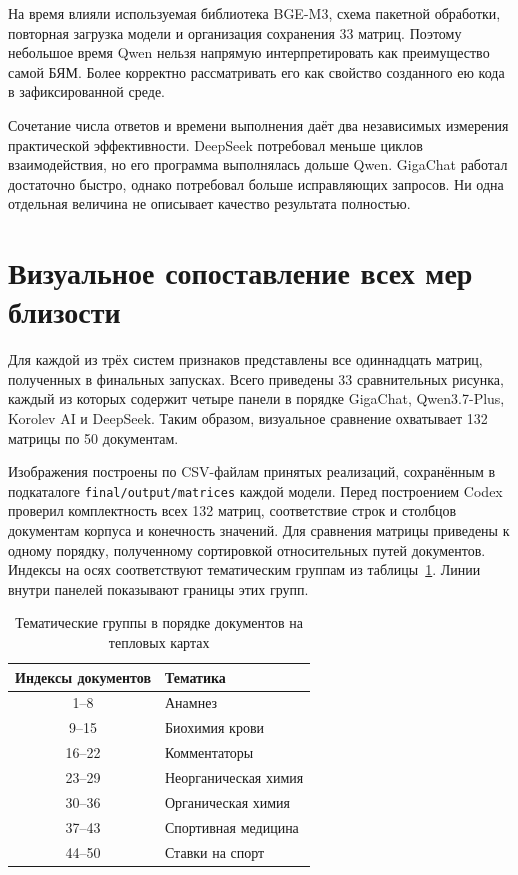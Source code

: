 \documentclass[a4paper,12pt]{extreport}
\newcommand{\code}[1]{\nolinkurl{#1}}
\begin{document}
На время влияли используемая библиотека BGE-M3, схема пакетной обработки, повторная загрузка модели и организация сохранения 33 матриц. Поэтому небольшое время Qwen нельзя напрямую интерпретировать как преимущество самой БЯМ. Более корректно рассматривать его как свойство созданного ею кода в зафиксированной среде.

Сочетание числа ответов и времени выполнения даёт два независимых измерения практической эффективности. DeepSeek потребовал меньше циклов взаимодействия, но его программа выполнялась дольше Qwen. GigaChat работал достаточно быстро, однако потребовал больше исправляющих запросов. Ни одна отдельная величина не описывает качество результата полностью.

\clearpage
\section{Визуальное сопоставление всех мер близости}
\label{sec:all-measures}

Для каждой из трёх систем признаков представлены все одиннадцать матриц, полученных в финальных запусках. Всего приведены 33 сравнительных рисунка, каждый из которых содержит четыре панели в порядке GigaChat, Qwen3.7-Plus, Korolev AI и DeepSeek. Таким образом, визуальное сравнение охватывает 132 матрицы по 50 документам.

Изображения построены по CSV-файлам принятых реализаций, сохранённым в подкаталоге \code{final/output/matrices} каждой модели. Перед построением Codex проверил комплектность всех 132 матриц, соответствие строк и столбцов документам корпуса и конечность значений. Для сравнения матрицы приведены к одному порядку, полученному сортировкой относительных путей документов. Индексы на осях соответствуют тематическим группам из таблицы~\ref{tab:heatmap-groups}. Линии внутри панелей показывают границы этих групп.

\begin{table}[H]
\caption{Тематические группы в порядке документов на тепловых картах}
\label{tab:heatmap-groups}
\centering
\begin{tabular}{|c|l|}
\hline
Индексы документов & Тематика \\
\hline
1--8 & Анамнез \\
9--15 & Биохимия крови \\
16--22 & Комментаторы \\
23--29 & Неорганическая химия \\
30--36 & Органическая химия \\
37--43 & Спортивная медицина \\
44--50 & Ставки на спорт \\
\hline
\end{tabular}
\end{table}
\end{document}
